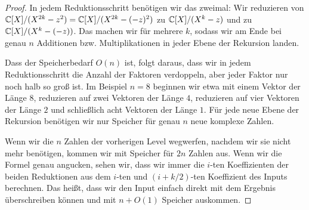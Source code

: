 \begin{proof}
    \medskip
    In jedem Reduktionsschritt benötigen wir das zweimal: Wir reduzieren von $\mathbb{C}[X]/(X^{2k}-z^2) = \mathbb{C}[X]/(X^{2k}-(-z)^2)$ zu $\mathbb{C}[X]/(X^k-z)$ und zu $\mathbb{C}[X]/(X^k-(-z))$.
    Das machen wir für mehrere $k$, sodass wir am Ende bei genau $n$ Additionen bzw. Multiplikationen in jeder Ebene der Rekursion landen.

    \medskip
    Dass der Speicherbedarf $O(n)$ ist, folgt daraus, dass wir in jedem Reduktionsschritt die Anzahl der Faktoren verdoppeln, aber jeder Faktor nur noch halb so groß ist. Im Beispiel $n=8$ beginnen wir etwa mit einem Vektor der Länge $8$, reduzieren auf zwei Vektoren der Länge $4$, reduzieren auf vier Vektoren der Länge $2$ und schließlich acht Vektoren der Länge $1$. Für jede neue Ebene der Rekursion benötigen wir nur Speicher für genau $n$ neue komplexe Zahlen.

    Wenn wir die $n$ Zahlen der vorherigen Level wegwerfen, nachdem wir sie nicht mehr benötigen, kommen wir mit Speicher für $2n$ Zahlen aus. Wenn wir die Formel genau angucken, sehen wir, dass wir immer die $i$-ten Koeffizienten der beiden Reduktionen aus dem $i$-ten und $(i+k/2)$-ten Koeffizient des Inputs berechnen. Das heißt, dass wir den Input einfach direkt mit dem Ergebnis überschreiben können und mit $n+O(1)$ Speicher auskommen.
\end{proof}